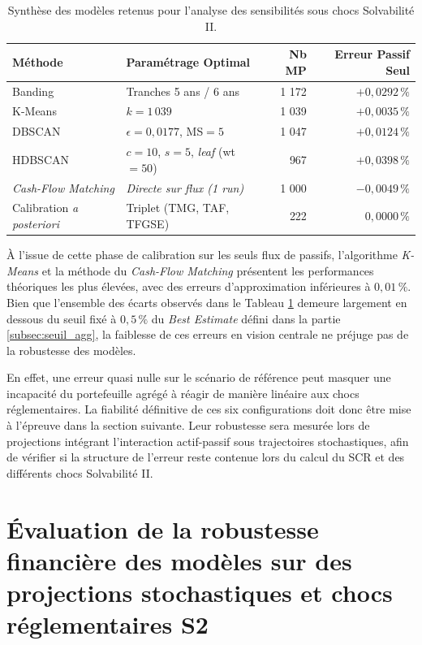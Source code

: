 \begin{table}[H]
    \centering
    \renewcommand{\arraystretch}{1.4}
    \begin{tabular}{|l|l|r|r|}
        \hline
        \textbf{Méthode} & \textbf{Paramétrage Optimal} & \textbf{Nb MP} & \textbf{Erreur Passif Seul} \\
        \hline
        Banding & Tranches 5 ans / 6 ans & 1 172 & $+0{,}0292\,\%$ \\
        K-Means & $k=1\,039$ & 1 039 & $+0{,}0035\,\%$ \\
        DBSCAN & $\epsilon=0{,}0177$, MS$=5$ & 1 047 & $+0{,}0124\,\%$ \\
        HDBSCAN & $c=10$, $s=5$, \textit{leaf} (wt$=50$) & 967 & $+0{,}0398\,\%$ \\
        \textit{Cash-Flow Matching} & \textit{Directe sur flux (1 \textit{run})} & 1 000 & $-0{,}0049\,\%$ \\
        Calibration \textit{a posteriori} & Triplet (TMG, TAF, TFGSE) & 222 & $0{,}0000\,\%$ \\
        \hline
    \end{tabular}
    \caption{Synthèse des modèles retenus pour l'analyse des sensibilités sous chocs Solvabilité II.}
    \label{tab:synthese_calibration_finale}
\end{table}

À l'issue de cette phase de calibration sur les seuls flux de passifs, l'algorithme \textit{K-Means} et la méthode du \textit{Cash-Flow Matching} présentent les performances théoriques les plus élevées, avec des erreurs d'approximation inférieures à $0{,}01\,\%$. Bien que l'ensemble des écarts observés dans le Tableau \ref{tab:synthese_calibration_finale} demeure largement en dessous du seuil fixé à $0{,}5\,\%$ du \textit{Best Estimate} défini dans la partie \ref{subsec:seuil_agg}, la faiblesse de ces erreurs en vision centrale ne préjuge pas de la robustesse des modèles. 

En effet, une erreur quasi nulle sur le scénario de référence peut masquer une incapacité du portefeuille agrégé à réagir de manière linéaire aux chocs réglementaires. La fiabilité définitive de ces six configurations doit donc être mise à l'épreuve dans la section suivante. Leur robustesse sera mesurée lors de projections intégrant l'interaction actif-passif sous trajectoires stochastiques, afin de vérifier si la structure de l'erreur reste contenue lors du calcul du SCR et des différents chocs Solvabilité II.

\section{Évaluation de la robustesse financière des modèles sur des projections stochastiques et chocs réglementaires S2}
\label{sec:evaluation_scr}

